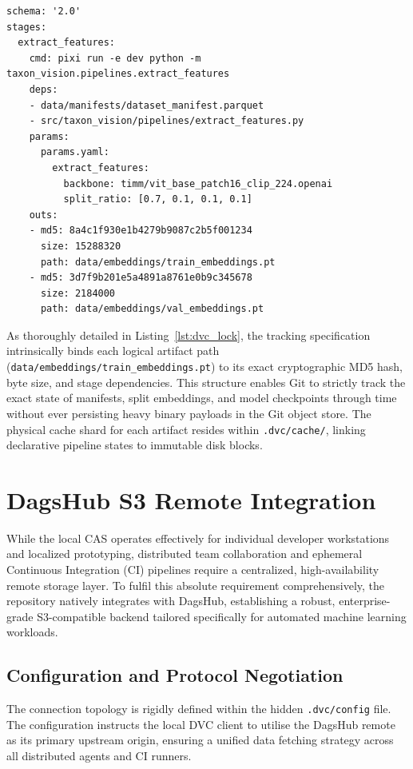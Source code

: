 \begin{listing}[H]
\begin{verbatim}
schema: '2.0'
stages:
  extract_features:
    cmd: pixi run -e dev python -m taxon_vision.pipelines.extract_features
    deps:
    - data/manifests/dataset_manifest.parquet
    - src/taxon_vision/pipelines/extract_features.py
    params:
      params.yaml:
        extract_features:
          backbone: timm/vit_base_patch16_clip_224.openai
          split_ratio: [0.7, 0.1, 0.1, 0.1]
    outs:
    - md5: 8a4c1f930e1b4279b9087c2b5f001234
      size: 15288320
      path: data/embeddings/train_embeddings.pt
    - md5: 3d7f9b201e5a4891a8761e0b9c345678
      size: 2184000
      path: data/embeddings/val_embeddings.pt
\end{verbatim}
\caption{Cryptographic DAG and artifact tracking structure within \texttt{dvc.lock}.}
\label{lst:dvc_lock}
\end{listing}

As thoroughly detailed in Listing~\ref{lst:dvc_lock}, the tracking specification intrinsically binds each logical artifact path (\texttt{data/embeddings/train\_embeddings.pt}) to its exact cryptographic MD5 hash, byte size, and stage dependencies. This structure enables Git to strictly track the exact state of manifests, split embeddings, and model checkpoints through time without ever persisting heavy binary payloads in the Git object store. The physical cache shard for each artifact resides within \texttt{.dvc/cache/}, linking declarative pipeline states to immutable disk blocks.

\section{DagsHub S3 Remote Integration}
\label{sec:dagshub_s3_remote}

While the local CAS operates effectively for individual developer workstations and localized prototyping, distributed team collaboration and ephemeral Continuous Integration (CI) pipelines require a centralized, high-availability remote storage layer. To fulfil this absolute requirement comprehensively, the repository natively integrates with DagsHub, establishing a robust, enterprise-grade S3-compatible backend tailored specifically for automated machine learning workloads.

\subsection{Configuration and Protocol Negotiation}
The connection topology is rigidly defined within the hidden \texttt{.dvc/config} file. The configuration instructs the local DVC client to utilise the DagsHub remote as its primary upstream origin, ensuring a unified data fetching strategy across all distributed agents and CI runners.

